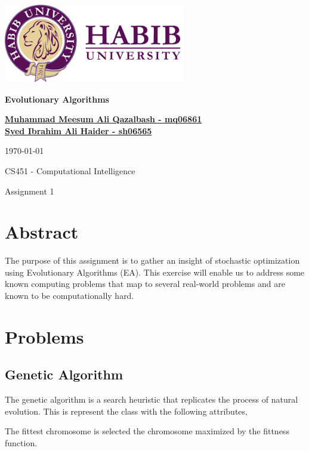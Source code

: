 \documentclass[12pt]{report}
\theoremstyle{mytheoremstyle}
\theoremstyle{mytheoremstyle}
\theoremstyle{myproblemstyle}
\begin{document}
\begin{titlepage}
	\vspace*{\fill}

	\begin{center}


		\includegraphics[width=0.6\textwidth]{images/logo.png}

		\vspace{2cm}

		\Huge
		\textbf{Evolutionary Algorithms}
		\vspace{0.5cm}

		\Large

		\textbf{ \href{mailto:mq06861@st.habib.edu.pk}{Muhammad Meesum Ali Qazalbash - mq06861}}\\
		\textbf{ \href{mailto:@st.habib.edu.pk}{{Syed Ibrahim Ali Haider - sh06565}}}

		\today
		\vspace{0.5cm}

		CS451 - Computational Intelligence

		\vspace{0.5cm}
		\large
		Assignment 1
	\end{center}

	\vspace*{\fill}
\end{titlepage}


\setcounter{page}{2}
\tableofcontents

\chapter{Abstract}
The purpose of this assignment is to gather an insight of stochastic optimization using Evolutionary Algorithms (EA). This exercise will enable us to address some known computing problems that map to several real-world problems and are known to be computationally hard.

\chapter{Problems}

\section{Genetic Algorithm}
The genetic algorithm is a search heuristic that replicates the process of natural evolution. This is represent the class with the following attributes,

The fittest chromosome is selected the chromosome maximized by the fittness function.

\end{document}
